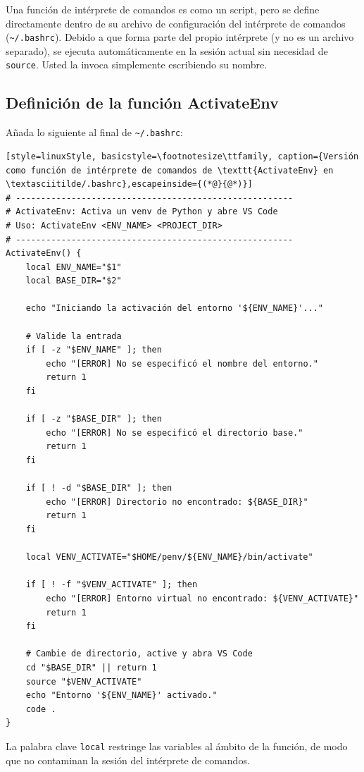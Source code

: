 Una función de intérprete de comandos es como un script, pero se define
directamente dentro de su archivo de configuración del intérprete de
comandos (\texttt{\textasciitilde/.bashrc}). Debido a que forma parte del
propio intérprete (y no es un archivo separado), se ejecuta automáticamente
en la sesión actual sin necesidad de \texttt{source}. Usted la invoca
simplemente escribiendo su nombre.

\subsection{Definición de la función ActivateEnv}

Añada lo siguiente al final de \texttt{\textasciitilde/.bashrc}:

\begin{lstlisting}[style=linuxStyle, basicstyle=\footnotesize\ttfamily, caption={Versión como función de intérprete de comandos de \texttt{ActivateEnv} en \textasciitilde/.bashrc},escapeinside={(*@}{@*)}]
# -------------------------------------------------------
# ActivateEnv: Activa un venv de Python y abre VS Code
# Uso: ActivateEnv <ENV_NAME> <PROJECT_DIR>
# -------------------------------------------------------
ActivateEnv() {
    local ENV_NAME="$1"
    local BASE_DIR="$2"

    echo "Iniciando la activación del entorno '${ENV_NAME}'..."

    # Valide la entrada
    if [ -z "$ENV_NAME" ]; then
        echo "[ERROR] No se especificó el nombre del entorno."
        return 1
    fi

    if [ -z "$BASE_DIR" ]; then
        echo "[ERROR] No se especificó el directorio base."
        return 1
    fi

    if [ ! -d "$BASE_DIR" ]; then
        echo "[ERROR] Directorio no encontrado: ${BASE_DIR}"
        return 1
    fi

    local VENV_ACTIVATE="$HOME/penv/${ENV_NAME}/bin/activate"

    if [ ! -f "$VENV_ACTIVATE" ]; then
        echo "[ERROR] Entorno virtual no encontrado: ${VENV_ACTIVATE}"
        return 1
    fi

    # Cambie de directorio, active y abra VS Code
    cd "$BASE_DIR" || return 1
    source "$VENV_ACTIVATE"
    echo "Entorno '${ENV_NAME}' activado."
    code .
}
\end{lstlisting}

La palabra clave \texttt{local} restringe las variables al ámbito de la
función, de modo que no contaminan la sesión del intérprete de comandos.

